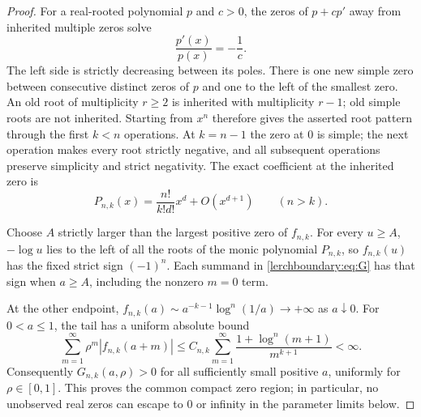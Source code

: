 \documentclass[11pt,a4paper]{article}
\theoremstyle{definition}
\theoremstyle{remark}
\numberwithin{equation}{section}
\begin{document}
\begin{proof}
For a real-rooted polynomial $p$ and $c>0$, the zeros of $p+cp'$ away
from inherited multiple zeros solve
\[
 \frac{p'(x)}{p(x)}=-\frac1c.
\]
The left side is strictly decreasing between its poles.  There is one
new simple zero between consecutive distinct zeros of $p$ and one to
the left of the smallest zero.  An old root of multiplicity $r\geq2$
is inherited with multiplicity $r-1$; old simple roots are not inherited.
Starting from $x^n$ therefore gives the asserted root pattern through
the first $k<n$ operations.  At $k=n-1$ the zero at $0$ is simple; the
next operation makes every root strictly negative, and all subsequent
operations preserve simplicity and strict negativity.  The exact
coefficient at the inherited zero is
\begin{equation}\label{lerchboundary:eq:leading}
 P_{n,k}(x)=\frac{n!}{k!d!}x^d+O(x^{d+1})\qquad(n>k).
\end{equation}

Choose $A$ strictly larger than the largest positive zero of $f_{n,k}$.
For every $u\geq A$, $-\log u$ lies to the left of all the roots of the
monic polynomial $P_{n,k}$, so $f_{n,k}(u)$ has the fixed strict sign
$(-1)^n$.  Each summand in \eqref{lerchboundary:eq:G} has that sign
when $a\geq A$, including the nonzero $m=0$ term.

At the other endpoint, $f_{n,k}(a)\sim a^{-k-1}\log^n(1/a)\to+\infty$
as $a\downarrow0$.  For $0<a\leq1$, the tail has a uniform absolute bound
\[
 \sum_{m=1}^{\infty}\rho^m|f_{n,k}(a+m)|
 \leq C_{n,k}\sum_{m=1}^{\infty}
       \frac{1+\log^n(m+1)}{m^{k+1}}<\infty.
\]
Consequently $G_{n,k}(a,\rho)>0$ for all sufficiently small positive
$a$, uniformly for $\rho\in[0,1]$.  This proves the common compact
zero region; in particular, no unobserved real zeros can escape to
$0$ or infinity in the parameter limits below.
\end{proof}
\end{document}
